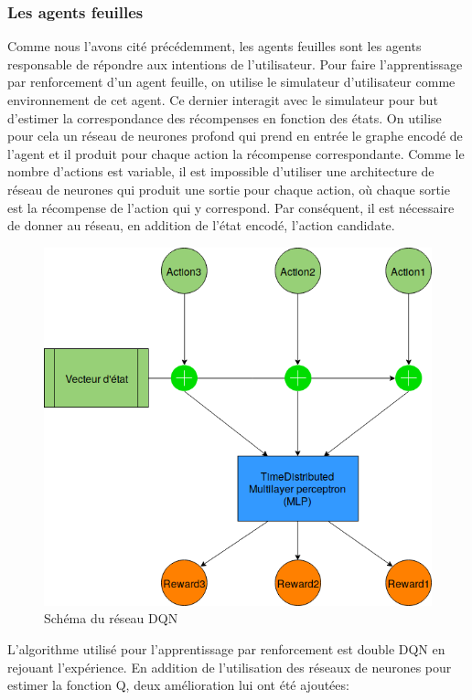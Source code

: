 \subsubsection*{Les agents feuilles}
Comme nous l'avons cité précédemment, les agents feuilles sont les agents responsable de répondre aux intentions de l'utilisateur. Pour faire l'apprentissage par renforcement d'un agent feuille, on utilise le simulateur d'utilisateur comme environnement de cet agent. Ce dernier interagit avec le simulateur pour but d'estimer la correspondance des récompenses en fonction des états. On utilise pour cela un réseau de neurones profond qui prend en entrée le graphe encodé de l'agent et il produit pour chaque action la récompense correspondante. Comme le nombre d'actions est variable, il est impossible d'utiliser une architecture de réseau de neurones qui produit une sortie pour chaque action, où chaque sortie est la récompense de l'action qui y correspond. Par conséquent, il est nécessaire de donner au réseau, en addition de l'état encodé, l'action candidate.
\begin{figure}[H] 
	\centering
	\includegraphics[width=0.5\linewidth]{images/Conception/DM/time_dist.png}
	\caption{Schéma du réseau DQN}
\end{figure}\label{time_dist}
L'algorithme utilisé pour l'apprentissage par renforcement est double DQN en rejouant l'expérience. En addition de l'utilisation des réseaux de neurones pour estimer la fonction Q, deux amélioration lui ont été ajoutées:
